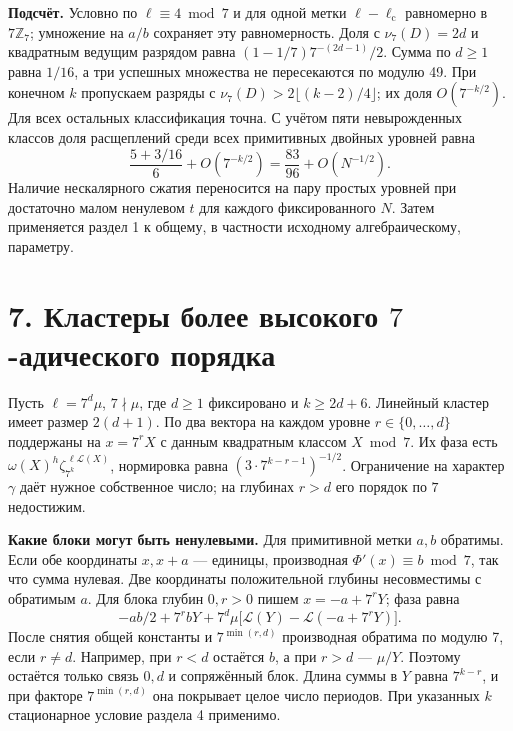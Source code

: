 \documentclass[11pt,a4paper]{article}
\newcommand{\sect}[1]{\section*{\sffamily\color{ink}#1}}
\newcommand{\subt}[1]{\par\medskip\noindent\textbf{#1.}\quad}
\newcommand{\zp}{\mathbb Z_7}
\begin{document}
\subt{Подсчёт}
Условно по \(\ell\equiv4\bmod7\) и для одной метки \(\ell-\ell_{\mathrm c}\) равномерно в \(7\zp\); умножение на \(a/b\) сохраняет эту равномерность. Доля с \(\nu_7(D)=2d\) и квадратным ведущим разрядом равна \((1-1/7)7^{-(2d-1)}/2\). Сумма по \(d\ge1\) равна \(1/16\), а три успешных множества не пересекаются по модулю 49. При конечном \(k\) пропускаем разряды с \(\nu_7(D)>2\lfloor(k-2)/4\rfloor\); их доля \(O(7^{-k/2})\). Для всех остальных классификация точна. С учётом пяти невырожденных классов доля расщеплений среди всех примитивных двойных уровней равна
\[
                  \frac{5+3/16}{6}+O(7^{-k/2})
                      = \frac{83}{96}+O(N^{-1/2}) .
\]
Наличие нескалярного сжатия переносится на пару простых уровней при достаточно малом ненулевом \(t\) для каждого фиксированного \(N\). Затем применяется раздел 1 к общему, в частности исходному алгебраическому, параметру.
\newpage
\sect{7. Кластеры более высокого \(7\)-адического порядка}
Пусть \(\ell=7^d\mu\), \(7\nmid\mu\), где \(d\ge1\) фиксировано и \(k\ge2d+6\). Линейный кластер имеет размер \(2(d+1)\). По два вектора на каждом уровне \(r\in\{0,\ldots,d\}\) поддержаны на \(x=7^r X\) с данным квадратным классом \(X\bmod7\). Их фаза есть \(\omega(X)^h\zeta_{7^k}^{\,\ell\mathcal L(X)}\), нормировка равна \((3\cdot7^{k-r-1})^{-1/2}\). Ограничение на характер \(\gamma\) даёт нужное собственное число; на глубинах \(r>d\) его порядок по \(7\) недостижим.

\subt{Какие блоки могут быть ненулевыми}
Для примитивной метки \(a,b\) обратимы. Если обе координаты \(x,x+a\) --- единицы, производная \(\Phi'(x)\equiv b\bmod7\), так что сумма нулевая. Две координаты положительной глубины несовместимы с обратимым \(a\). Для блока глубин \(0,r>0\) пишем \(x=-a+7^r Y\); фаза равна
\[
 -ab/2+7^r bY+7^d\mu\big[\mathcal L(Y)-\mathcal L(-a+7^rY)\big].
\]
После снятия общей константы и \(7^{\min(r,d)}\) производная обратима по модулю 7, если \(r\ne d\). Например, при \(r<d\) остаётся \(b\), а при \(r>d\) --- \(\mu/Y\). Поэтому остаётся только связь \(0,d\) и сопряжённый блок. Длина суммы в \(Y\) равна \(7^{k-r}\), и при факторе \(7^{\min(r,d)}\) она покрывает целое число периодов. При указанных \(k\) стационарное условие раздела 4 применимо.
\end{document}
